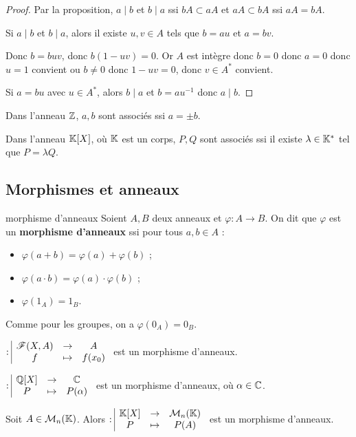 \begin{proof}
    Par la proposition, $a \mid b$ et $b \mid a$ ssi $bA \subset aA$ et $aA \subset bA$ ssi 
    $aA = bA$.

    Si $a \mid b$ et $b \mid a$, alors il existe $u, v \in A$ tels que
    $b = au$ et $a = bv$. 

    Donc $b = buv$, donc $b(1 - uv) = 0$. Or $A$ est intègre donc 
    $b = 0$ donc $a = 0$ donc $u = 1$ convient ou $b \neq 0$ donc $1 - uv = 0$, donc $v \in A^*$ convient. 

    Si $a = bu$ avec $u \in A^*$, alors $b \mid a $ et $b = au^{-1}$ donc $a \mid b$.
\end{proof}

\begin{exemple}
    Dans l'anneau $\mathbb{Z}$, $a, b$ sont associés ssi $a = \pm b$.

    Dans l'anneau $\mathbb{K}[X]$, où $\mathbb{K}$ est un corps, $P, Q$ sont associés ssi
    il existe $\lambda \in \mathbb{K}^*$ tel que $P = \lambda Q$.
\end{exemple}

\subsection{Morphismes et anneaux}

\begin{definition}{morphisme d'anneaux}{}
    Soient $A, B$ deux anneaux et $\varphi : A \to B$. On dit que $\varphi$ est un
    \textbf{morphisme d'anneaux} ssi pour tous $a, b \in A$ :
    \begin{itemize}
        \item $\varphi(a + b) = \varphi(a) + \varphi(b)$ ;
        \item $\varphi(a \cdot b) = \varphi(a) \cdot \varphi(b)$ ;
        \item $\varphi(1_A) = 1_B$.
    \end{itemize}
\end{definition}

\begin{remarque}
    Comme pour les groupes, on a $\varphi(0_A) = 0_B$.
\end{remarque}

\begin{exemple}
    $: \space \begin{array}{|ccc} \displaystyle \mathscr F(X, A) & \to & \displaystyle A \\ \displaystyle f & \mapsto & \displaystyle f(x_0) \end{array}$ est un morphisme d'anneaux. 

    \avspace 
    $: \space \begin{array}{|ccc} \displaystyle \mathbb{Q} [X] & \to & \displaystyle \mathbb{C} \\ \displaystyle P & \mapsto & \displaystyle P(\alpha) \end{array}$ est un morphisme d'anneaux, où $\alpha \in \mathbb{C}$.

    Soit $A \in \mathcal M_n(\mathbb{K})$. Alors $: \space \begin{array}{|ccc} \displaystyle \mathbb{K}[X] & \to & \displaystyle \mathcal M_n(\mathbb{K}) \\ \displaystyle P & \mapsto & \displaystyle P(A) \end{array}$ est un morphisme d'anneaux.
\end{exemple}




